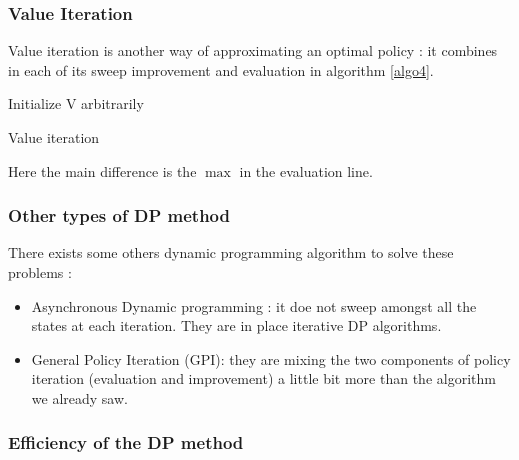 \documentclass[14pt,a4paper]{article}
\theoremstyle{definition}
\begin{document}
\subsubsection{Value Iteration}
Value iteration is another way of approximating an optimal policy : it combines in each of its sweep improvement and evaluation in algorithm \ref{algo4}.

\begin{algorithm}
    \label{algo4}
    
	    
    Initialize V arbitrarily 
    

    
\caption{Value iteration}
\end{algorithm}


Here the main difference is the $\max$ in the evaluation line.


\subsubsection{Other types of DP method}

There exists some others dynamic programming algorithm to solve these problems : 
\begin{itemize}
\item Asynchronous Dynamic programming : it doe not sweep amongst all the states at each iteration. They are in place iterative DP algorithms.
\item General Policy Iteration (GPI): they are mixing the two components of policy iteration (evaluation and improvement) a little bit more than the algorithm we already saw.
\end{itemize}


\subsubsection{Efficiency of the DP method}


\newpage
\end{document}

